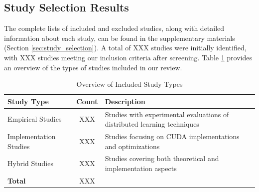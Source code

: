 \subsection{Study Selection Results}
\label{sec:study_selection_results}
The complete lists of included and excluded studies, along with detailed information about each study, can be found in the supplementary materials (Section \ref{sec:study_selection}). A total of XXX studies were initially identified, with XXX studies meeting our inclusion criteria after screening. Table \ref{tab:study_types} provides an overview of the types of studies included in our review.

\begin{table}[ht]
	\centering
	\caption{Overview of Included Study Types}
	\label{tab:study_types}
	\begin{tabular}{|l|c|p{8cm}|}
		\hline
		\textbf{Study Type}    & \textbf{Count} & \textbf{Description}                                                     \\
		\hline
		Empirical Studies      & XXX            & Studies with experimental evaluations of distributed learning techniques \\
		\hline
		Implementation Studies & XXX            & Studies focusing on CUDA implementations and optimizations               \\
		\hline
		Hybrid Studies         & XXX            & Studies covering both theoretical and implementation aspects             \\
		\hline
		\textbf{Total}         & XXX            &                                                                          \\
		\hline
	\end{tabular}
\end{table}

